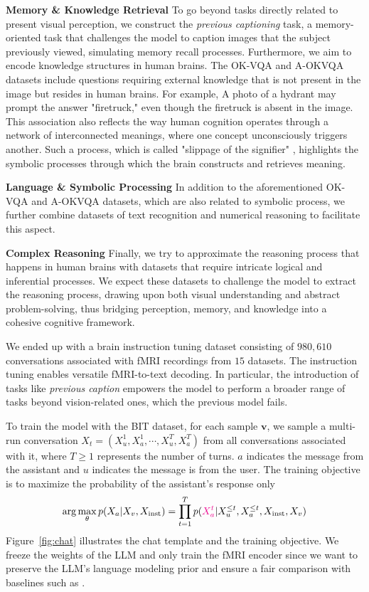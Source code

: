 \noindent\textbf{Memory \& Knowledge Retrieval} To go beyond tasks directly related to present visual perception, we construct the \emph{previous captioning} task, a memory-oriented task that challenges the model to caption images that the subject previously viewed, simulating memory recall processes. Furthermore, we aim to encode knowledge structures in human brains. The OK-VQA \citep{marino2019ok} and A-OKVQA \citep{schwenk2022okvqa} datasets include questions requiring external knowledge that is not present in the image but resides in human brains. For example, A photo of a hydrant may prompt the answer "firetruck," even though the firetruck is absent in the image. This association also reflects the way human cognition operates through a network of interconnected meanings, where one concept unconsciously triggers another. Such a process, which is called "slippage of the signifier" \citep{lacan2001ecrits, lacan1988seminar, miller2018four}, highlights the symbolic processes through which the brain constructs and retrieves meaning. 

\noindent\textbf{Language \& Symbolic Processing} In addition to the aforementioned OK-VQA and A-OKVQA datasets, which are also related to symbolic process, we further combine datasets of text recognition \citep{biten2019scene} and numerical reasoning \citep{acharya2019tallyqa} to facilitate this aspect.

\noindent\textbf{Complex Reasoning} Finally, we try to approximate the reasoning process that happens in human brains with datasets \citep{liu2023visual,wang2023see,li2018vqa} that require intricate logical and inferential processes. We expect these datasets to challenge the model to extract the reasoning process, drawing upon both visual understanding and abstract problem-solving, thus bridging perception, memory, and knowledge into a cohesive cognitive framework.

We ended up with a brain instruction tuning dataset consisting of $980,610$ conversations associated with fMRI recordings from $15$ datasets. The instruction tuning enables versatile fMRI-to-text decoding. In particular, the introduction of tasks like \textit{previous caption} empowers the model to perform a broader range of tasks beyond vision-related ones, which the previous model \citep{xia2024umbrae} fails.

To train the model with the BIT dataset, for each sample $\boldsymbol{v}$, we sample a multi-run conversation $X_t = (X_u^1, X_a^1, \cdots, X_u^T, X_a^T)$ from all conversations associated with it, where $T \geq 1$ represents the number of turns. $a$ indicates the message from the assistant and $u$ indicates the message is from the user. The training objective is to maximize the probability of the assistant's response only
$$
\arg\max_\theta p(X_a | X_v, X_{\text{inst}}) = \prod_{t=1}^T p({\color{magenta}X_a^t} | X_u^{\leq t}, X_a^{\le t }, X_\text{inst}, X_v)
$$
Figure~\ref{fig:chat} illustrates the chat template and the training objective. We freeze the weights of the LLM and only train the fMRI encoder since we want to preserve the LLM's language modeling prior and ensure a fair comparison with baselines such as \citet{xia2024umbrae}.

